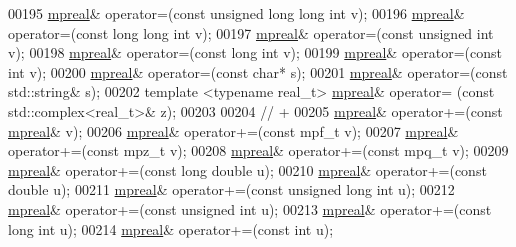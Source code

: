 \begin{DoxyCode}
00195     \hyperlink{classmpfr_1_1mpreal}{mpreal}& operator=(\textcolor{keyword}{const} \textcolor{keywordtype}{unsigned} \textcolor{keywordtype}{long} \textcolor{keywordtype}{long} \textcolor{keywordtype}{int} v);
00196     \hyperlink{classmpfr_1_1mpreal}{mpreal}& operator=(\textcolor{keyword}{const} \textcolor{keywordtype}{long} \textcolor{keywordtype}{long} \textcolor{keywordtype}{int} v);
00197     \hyperlink{classmpfr_1_1mpreal}{mpreal}& operator=(\textcolor{keyword}{const} \textcolor{keywordtype}{unsigned} \textcolor{keywordtype}{int} v);
00198     \hyperlink{classmpfr_1_1mpreal}{mpreal}& operator=(\textcolor{keyword}{const} \textcolor{keywordtype}{long} \textcolor{keywordtype}{int} v);
00199     \hyperlink{classmpfr_1_1mpreal}{mpreal}& operator=(\textcolor{keyword}{const} \textcolor{keywordtype}{int} v);
00200     \hyperlink{classmpfr_1_1mpreal}{mpreal}& operator=(\textcolor{keyword}{const} \textcolor{keywordtype}{char}* s);
00201     \hyperlink{classmpfr_1_1mpreal}{mpreal}& operator=(\textcolor{keyword}{const} std::string& s);
00202     \textcolor{keyword}{template} <\textcolor{keyword}{typename} real\_t> \hyperlink{classmpfr_1_1mpreal}{mpreal}& operator= (\textcolor{keyword}{const} std::complex<real\_t>& z);
00203 
00204     \textcolor{comment}{// +}
00205     \hyperlink{classmpfr_1_1mpreal}{mpreal}& operator+=(\textcolor{keyword}{const} \hyperlink{classmpfr_1_1mpreal}{mpreal}& v);
00206     \hyperlink{classmpfr_1_1mpreal}{mpreal}& operator+=(\textcolor{keyword}{const} mpf\_t v);
00207     \hyperlink{classmpfr_1_1mpreal}{mpreal}& operator+=(\textcolor{keyword}{const} mpz\_t v);
00208     \hyperlink{classmpfr_1_1mpreal}{mpreal}& operator+=(\textcolor{keyword}{const} mpq\_t v);
00209     \hyperlink{classmpfr_1_1mpreal}{mpreal}& operator+=(\textcolor{keyword}{const} \textcolor{keywordtype}{long} \textcolor{keywordtype}{double} u);
00210     \hyperlink{classmpfr_1_1mpreal}{mpreal}& operator+=(\textcolor{keyword}{const} \textcolor{keywordtype}{double} u);
00211     \hyperlink{classmpfr_1_1mpreal}{mpreal}& operator+=(\textcolor{keyword}{const} \textcolor{keywordtype}{unsigned} \textcolor{keywordtype}{long} \textcolor{keywordtype}{int} u);
00212     \hyperlink{classmpfr_1_1mpreal}{mpreal}& operator+=(\textcolor{keyword}{const} \textcolor{keywordtype}{unsigned} \textcolor{keywordtype}{int} u);
00213     \hyperlink{classmpfr_1_1mpreal}{mpreal}& operator+=(\textcolor{keyword}{const} \textcolor{keywordtype}{long} \textcolor{keywordtype}{int} u);
00214     \hyperlink{classmpfr_1_1mpreal}{mpreal}& operator+=(\textcolor{keyword}{const} \textcolor{keywordtype}{int} u);

\end{DoxyCode}
